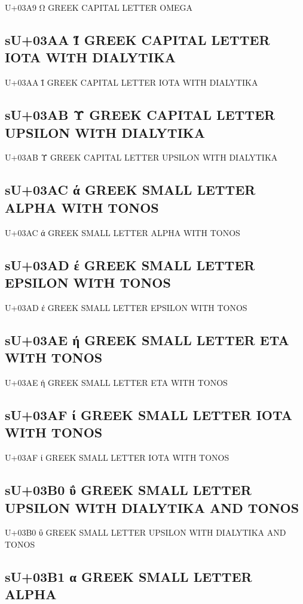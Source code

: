 U+03A9 Ω GREEK CAPITAL LETTER OMEGA

\subsection{sU+03AA Ϊ GREEK CAPITAL LETTER IOTA WITH DIALYTIKA}

U+03AA Ϊ GREEK CAPITAL LETTER IOTA WITH DIALYTIKA

\subsection{sU+03AB Ϋ GREEK CAPITAL LETTER UPSILON WITH DIALYTIKA}

U+03AB Ϋ GREEK CAPITAL LETTER UPSILON WITH DIALYTIKA

\subsection{sU+03AC ά GREEK SMALL LETTER ALPHA WITH TONOS}

U+03AC ά GREEK SMALL LETTER ALPHA WITH TONOS

\subsection{sU+03AD έ GREEK SMALL LETTER EPSILON WITH TONOS}

U+03AD έ GREEK SMALL LETTER EPSILON WITH TONOS

\subsection{sU+03AE ή GREEK SMALL LETTER ETA WITH TONOS}

U+03AE ή GREEK SMALL LETTER ETA WITH TONOS

\subsection{sU+03AF ί GREEK SMALL LETTER IOTA WITH TONOS}

U+03AF ί GREEK SMALL LETTER IOTA WITH TONOS

\subsection{sU+03B0 ΰ GREEK SMALL LETTER UPSILON WITH DIALYTIKA AND TONOS}

U+03B0 ΰ GREEK SMALL LETTER UPSILON WITH DIALYTIKA AND TONOS

\subsection{sU+03B1 α GREEK SMALL LETTER ALPHA}

